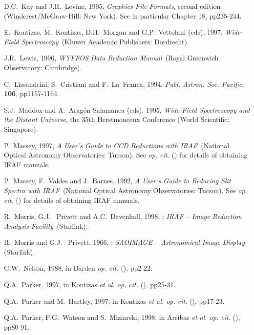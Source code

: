 \documentclass[chapters,twoside,11pt]{starlink}
\begin{document}
\begin{thebibliography}{99}
   D.C.~Kay and J.R.~Levine, 1995, \textit{Graphics File
   Formats}, second edition
  \newline (Windcrest/McGraw-Hill: New York).  See in particular
   Chapter 18, pp235-244.

   E.~Kontizas, M.~Kontizas, D.H.~Morgan and
   G.P.~Vettolani (eds), 1997, \textit{Wide-Field Spectroscopy}\,
   (Kluwer Academic Publishers: Dordrecht).

   J.R.~Lewis, 1996, \textit{WYFFOS Data Reduction
   Manual}\, (Royal Greenwich Observatory: Cambridge).

   C.~Lissandrini, S.~Cristiani and F.~La~Franca,
   1994, \textit{Publ. Astron. Soc. Pacific}, \textbf{106}, pp1157-1164.

   S.J.~Maddox and A.~Arag\'{o}n-Salamanca (eds),
   1995, \textit{Wide Field Spectroscopy and the Distant Universe},
   the 35th Herstmonceux Conference (World Scientific: Singapore).

   P.~Massey, 1997, \textit{A User's Guide to CCD
   Reductions with IRAF}\, (National Optical Astronomy Observatories:
   Tucson).  See  \textit{op. cit.}\/ (\cite{SG12})
   for details of obtaining IRAF manuals.

   P.~Massey, F.~Valdes and J.~Barnes, 1992, \textit{A User's Guide to Reducing Slit Spectra with IRAF}\, (National
   Optical Astronomy Observatories: Tucson).  See 
   \textit{op. cit.}\/ (\cite{SG12}) for details of obtaining IRAF manuals.

   R.~Morris, G.J.~ Privett and A.C.~Davenhall, 1998,
   : \textit{IRAF -- Image Reduction Analysis Facility}\,
   (Starlink).

   R.~Morris and G.J.~ Privett, 1966,
   : \textit{SAOIMAGE -- Astronomical Image Display}\,
   (Starlink).

   G.W.~Nelson, 1988, in Barden \textit{op. cit.}\/
   (\cite{BARDEN88}), pp2-22.

   Q.A.~Parker, 1997, in Kontizas \textit{et al. op.
   cit.}\/ (\cite{KONTIZAS97}), pp25-31.

   Q.A.~Parker and M.~Hartley, 1997, in Kontizas \textit{et al. op. cit.}\/ (\cite{KONTIZAS97}), pp17-23.

   Q.A.~Parker, F.G.~Watson and S.~Miziarski, 1998, in
   Arribas \textit{et al. op. cit.}\/ (\cite{ARRIBAS98}), pp80-91.


\end{thebibliography}
\end{document}
